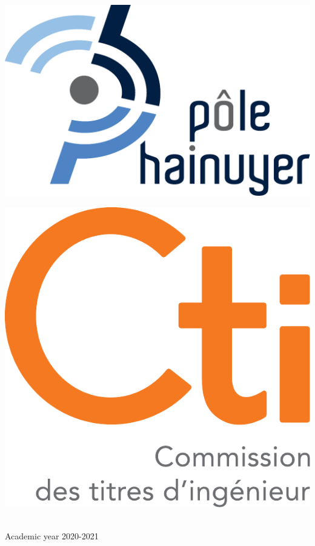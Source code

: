 \begin{titlepage}
\begin{center}
\begin{minipage}[c]{0.3\textwidth}
    \end{minipage}
    \hfill
    \begin{minipage}[c]{0.3\textwidth}
      \centering
      \includegraphics[width=.5\linewidth]{img/logo/pole_hainuyer_horizontal}
    \end{minipage}
    \hfill
    \begin{minipage}[c]{0.3\textwidth}
      \centering
      \includegraphics[width=.4\linewidth]{img/logo/cti}
    \end{minipage}\\[1cm]

    \large Academic year 2020-2021
    \vfill
  \end{center}
\end{titlepage}

